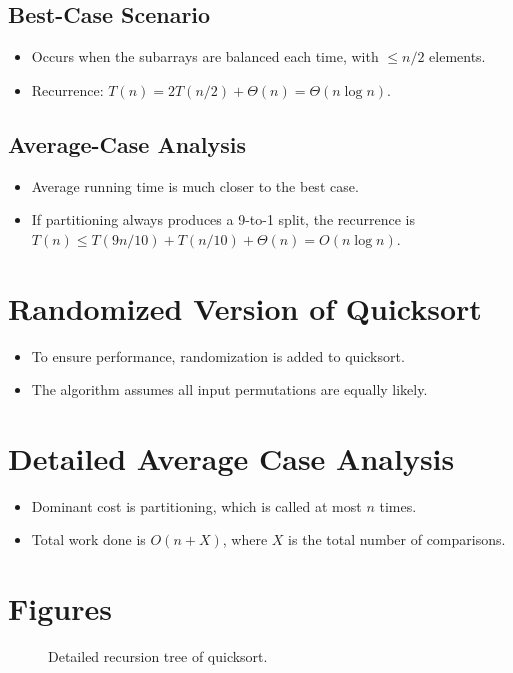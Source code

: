 \documentclass[12pt,openany]{book}
\theoremstyle{definition}
\begin{document}
\subsection{Best-Case Scenario}
\begin{itemize}
	\item Occurs when the subarrays are balanced each time, with \( \leq n/2 \) elements.
	\item Recurrence: \( T(n) = 2T(n/2) + \Theta(n) = \Theta(n \log n) \).
\end{itemize}

\subsection{Average-Case Analysis}
\begin{itemize}
	\item Average running time is much closer to the best case.
	\item If partitioning always produces a 9-to-1 split, the recurrence is \( T(n) \leq T(9n/10) + T(n/10) + \Theta(n) = O(n \log n) \).
\end{itemize}

\section{Randomized Version of Quicksort}
\begin{itemize}
	\item To ensure performance, randomization is added to quicksort.
	\item The algorithm assumes all input permutations are equally likely.
\end{itemize}

\section{Detailed Average Case Analysis}
\begin{itemize}
	\item Dominant cost is partitioning, which is called at most \( n \) times.
	\item Total work done is \( O(n + X) \), where \( X \) is the total number of comparisons.
\end{itemize}

\section{Figures}
\begin{figure}[htp]
	\centering
	\caption{Detailed recursion tree of quicksort.}
\end{figure}
\end{document}
